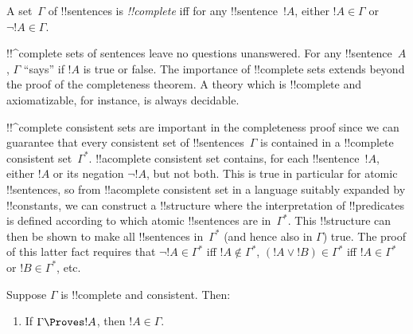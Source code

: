 \documentclass[../../../include/open-logic-section]{subfiles}
\begin{document}

\begin{defn}
 A set~$\Gamma$ of !!{sentence}s is
\emph{!!{complete}} iff for any !!{sentence}~$!A$, either $!A \in
\Gamma$ or $\lnot !A \in \Gamma$.
\end{defn}

\begin{explain}
  !!^{complete} sets of sentences leave no questions unanswered. For any
  !!{sentence}~$A$, $\Gamma$ ``says'' if $!A$ is true or false.  The
  importance of !!{complete} sets extends beyond the proof of the
  completeness theorem. A theory which is !!{complete} and
  axiomatizable, for instance, is always decidable.
\end{explain}

\begin{explain}
  !!^{complete} consistent sets are important in the completeness proof
  since we can guarantee that every consistent set of
  !!{sentence}s~$\Gamma$ is contained in a !!{complete} consistent
  set~$\Gamma^*$.  !!a{complete} consistent set contains, for
  each !!{sentence}~$!A$, either $!A$ or its negation $\lnot !A$, but
  not both. This is true in particular for atomic !!{sentence}s, so
  from !!a{complete} consistent set in a language suitably expanded by
  !!{constant}s, we can construct a !!{structure} where the
  interpretation of !!{predicate}s is defined according to which
  atomic !!{sentence}s are in~$\Gamma^*$. This !!{structure} can then
  be shown to make all !!{sentence}s in~$\Gamma^*$ (and hence also in
  $\Gamma$) true. The proof of this latter fact requires that $\lnot
  !A \in \Gamma^*$ iff $!A \notin \Gamma^*$, $(!A \lor !B) \in
  \Gamma^*$ iff $!A \in \Gamma^*$ or $!B \in \Gamma^*$, etc.
\end{explain}

\begin{prop}
Suppose $\Gamma$ is !!{complete} and consistent. Then:
\begin{enumerate}
\item {} If $\Gamma \Proves !A$, then $!A \in
  \Gamma$.



\end{enumerate}
\end{prop}
\end{document}
